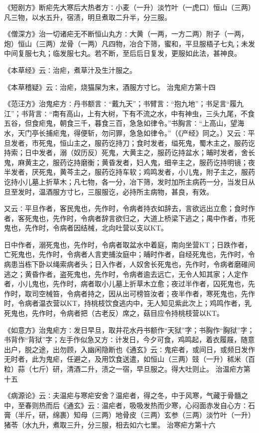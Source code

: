 \documentclass[a4paper,12pt,UTF8,twoside]{ctexbook}
\begin{document}
《短剧方》断疟先大寒后大热者方∶小麦（一升）淡竹叶（一虎口）恒山（三两）凡三物，以水五升，宿渍，明旦煮取二升半，分三服。

《僧深方》治一切诸疟无不断恒山丸方∶大黄（一两，一方二两）附子（一两，炮）恒山（三两）龙骨（一两）凡四物，冶合下筛，蜜和，平旦服梧子七丸；未发中间复服七丸；临发服七丸。若不断，至后后日复发，更服如此法，甚神良。

《本草经》云∶治疟，煮草汁及生汁服之。

《本草稽疑》云∶治疟，烧猫屎为末，酒服方寸匕。
治鬼疟方第十四

《范汪方》治鬼疟方∶丹书额言∶“戴九天”；书臂言∶“抱九地”；书足言“履九江”；书背言∶“南有高山，上有大树，下有不流之水，中有神虫，三头九尾，不食五谷，但食疟鬼，朝食三千，暮食三百，急急如律令。”书胸言∶“上高山，望海水，天门亭长捕疟鬼，得便斩，勿问罪，急急如律令。”（《产经》同之。）又云∶平旦发者，市死鬼，恒山主之，服药讫持刀；食时发者，缢死鬼，蜀木主之，服药讫持索；日中发者，溺（奴历反）死鬼，大黄主之，服药讫持盆水；晡时发者，舍长鬼，麻黄主之，服药讫持磨衡；黄昏发者，妇人鬼，细辛主之，服药讫持明镜；夜半发者，厌死鬼，黄芩主之，服药讫持车软；鸡鸣发者，小儿鬼，附子主之，服药讫持小儿墓上折草木；凡七物，各一分，冶下筛，发时加所主病药一分，当发日从旦至发时，温酒服方寸匕，三服服讫，必持所主病物，甚良，有效。

又云∶平旦作者，客民鬼也，先作时，令病者持衣如辞去，言欲远出立愈；食时作者，客死鬼也，先作时，令病者辞言欲归之，大道上桥梁下逃之；禺中作者，市死鬼也，先作时，令病者因结械，北向吐营以支以KT。

日中作者，溺死鬼也，先作时，令病者取盆水中着庭，南向坐营KT；日跌作者，亡死鬼也，先作时，令病者人言吏捕汝庭中；晡时作者，自经死鬼也，先作时，令病患当栋下卧以绳索病者头；日入作者，人奴舍长死鬼也，先作时，令病者磨碓间逃之；黄昏作者，盗死鬼也，先作时，令病者逾去远亡，无令人知其家；人定作者，小儿鬼也，先作时，病者取小儿墓上折草木立愈；夜过半作者，囚死鬼也，先作时，取司空械笞，令病者持之，因从出可榜笞汝者；夜半作者，寒死鬼也，先作时，令病者温衣营以KT，持桃枝饮食逃内中，无人知见紫此次上；鸡鸣作者，乳死鬼也，先作时，令病者把（古老反）席之，菇目应令持桃枝营以KT。

《如意方》治鬼疟方∶发日早旦，取井花水丹书额作“天狱”字；书胸作“胸狱”字；书背作“背狱”字；左手作似急又方∶计发日，今夕可食，鸡鸣起，着衣履屐，随意出户，脱之途，出勿顾，入幽闲隐断也《通玄》云∶鬼疟者，或间日，或频日发作无时者，此为鬼疟，任避之，及用饮食送遣，如恒山（三两）豉（一升）秫米（百粒）蒜（七斤）研，清酒二升，渍之一宿，早旦服之。得大吐则止。
治温疟方第十五

《病源论》云∶夫温疟与寒疟安舍？温疟者，得之冬，中于风寒，气藏于骨髓之中，至春则热而后《通玄》云∶温疟者，吸吸发热而少寒，心闷面赤发自心方∶石膏（半斤，研，绵裹）知母（三两）地骨皮（三两）玄参（三两）淡竹叶（一升）猪苓（水九升，煮取三升，分三服，相去如六七里。
治寒疟方第十六
\end{document}
